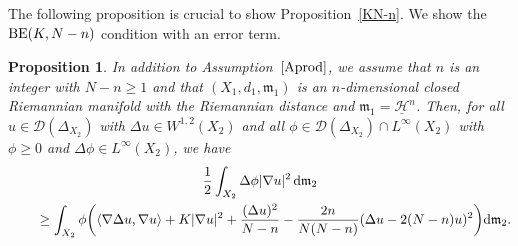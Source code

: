 \documentclass[10pt,a4paper]{amsart}
\numberwithin{equation}{section}
\newtheorem{Prop}[Thm]{Proposition}
\theoremstyle{definition}
\newcommand{\mf}{\mathfrak{m}}
\newcommand{\BE}{{\rm BE}}
\newcommand{\nHa}{\underline{\mathcal{H}}}
\newcommand{\D}{\mathcal{D}}
\begin{document}
The following proposition is crucial to show Proposition~\ref{KN-n}.
We show the $\BE(K,N-n)$ condition with an error term.
\begin{Prop}\label{preBE}
In addition to Assumption~$\ref{Aprod}$, we assume that $n$ is an integer with $N-n\geq 1$ and that $(X_1,d_1,\mf_1)$ is an $n$-dimensional closed Riemannian manifold with the Riemannian distance and $\mf_1=\nHa^n$.
Then, for all $u\in\D(\Delta_{X_2})$ with $\Delta u\in W^{1,2}(X_2)$ and all $\phi\in\D(\Delta_{X_2})\cap L^\infty(X_2)$ with $\phi\geq0$ and $\Delta \phi\in L^\infty(X_2)$, we have
\begin{gather*}
\frac{1}{2}\int_{X_2}\Delta \phi|\nabla u|^2 \,{\rm d}\mf_2
\\ \qquad
{}\geq \int_{X_2} \phi\bigg(\langle\nabla \Delta u,\nabla u\rangle+K|\nabla u|^2+\frac{(\Delta u)^2}{N-n}-\frac{2n}{N(N-n)}(\Delta u-2(N-n)u)^2\bigg) {\rm d}\mf_2.
\end{gather*}
\end{Prop}
\end{document}
